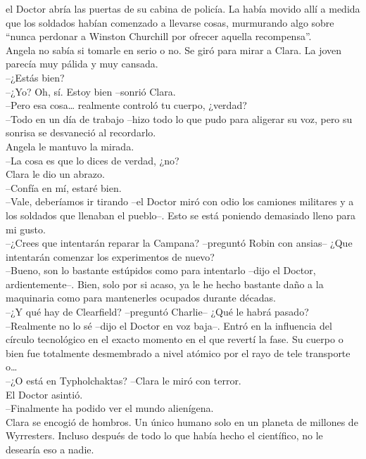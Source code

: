 el Doctor abría las puertas de su cabina de policía. La había movido
allí a medida que los soldados habían comenzado a llevarse cosas,
murmurando algo sobre ``nunca perdonar a Winston Churchill por ofrecer
aquella recompensa''.\\
Angela no sabía si tomarle en serio o no. Se giró para mirar a Clara. La
joven parecía muy pálida y muy cansada.\\
--¿Estás bien?\\
--¿Yo? Oh, sí. Estoy bien --sonrió Clara.\\
--Pero esa cosa\ldots{} realmente controló tu cuerpo, ¿verdad?\\
--Todo en un día de trabajo --hizo todo lo que pudo para aligerar su
voz, pero su sonrisa se desvaneció al recordarlo.\\
Angela le mantuvo la mirada.\\
--La cosa es que lo dices de verdad, ¿no?\\
Clara le dio un abrazo.\\
--Confía en mí, estaré bien.\\
--Vale, deberíamos ir tirando --el Doctor miró con odio los camiones
militares y a los soldados que llenaban el pueblo--. Esto se está
poniendo demasiado lleno para mi gusto.\\
--¿Crees que intentarán reparar la Campana? --preguntó Robin con
ansias-- ¿Que intentarán comenzar los experimentos de nuevo?\\
--Bueno, son lo bastante estúpidos como para intentarlo --dijo el
Doctor, ardientemente--. Bien, solo por si acaso, ya le he hecho
bastante daño a la maquinaria como para mantenerles ocupados durante
décadas.\\
--¿Y qué hay de Clearfield? --preguntó Charlie-- ¿Qué le habrá pasado?\\
--Realmente no lo sé --dijo el Doctor en voz baja--. Entró en la
influencia del círculo tecnológico en el exacto momento en el que
revertí la fase. Su cuerpo o bien fue totalmente desmembrado a nivel
atómico por el rayo de tele transporte o\ldots{}\\
--¿O está en Typholchaktas? --Clara le miró con terror.\\
El Doctor asintió.\\
--Finalmente ha podido ver el mundo alienígena.\\
Clara se encogió de hombros. Un único humano solo en un planeta de
millones de Wyrresters. Incluso después de todo lo que había hecho el
científico, no le desearía eso a nadie.\\
